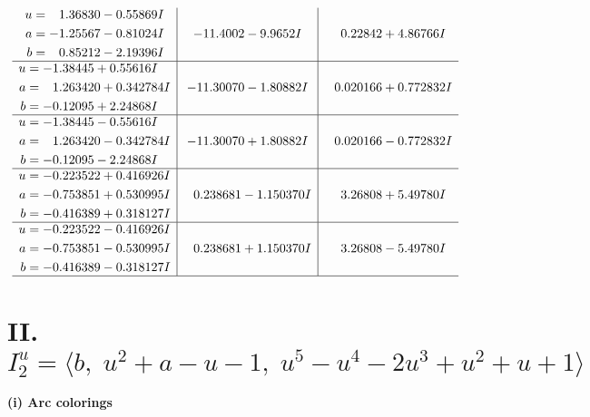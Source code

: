\documentclass[1p]{elsarticle_modified}
\theoremstyle{definition}
\begin{document}
$$\begin{array}{c|c|c}
\begin{aligned}
u &= \phantom{-}1.36830 - 0.55869 I \\
a &= -1.25567 - 0.81024 I \\
b &= \phantom{-}0.85212 - 2.19396 I\end{aligned}
 & -11.4002 - 9.9652 I & \phantom{-}0.22842 + 4.86766 I \\ \hline\begin{aligned}
u &= -1.38445 + 0.55616 I \\
a &= \phantom{-}1.263420 + 0.342784 I \\
b &= -0.12095 + 2.24868 I\end{aligned}
 & -11.30070 - 1.80882 I & \phantom{-}0.020166 + 0.772832 I \\ \hline\begin{aligned}
u &= -1.38445 - 0.55616 I \\
a &= \phantom{-}1.263420 - 0.342784 I \\
b &= -0.12095 - 2.24868 I\end{aligned}
 & -11.30070 + 1.80882 I & \phantom{-}0.020166 - 0.772832 I \\ \hline\begin{aligned}
u &= -0.223522 + 0.416926 I \\
a &= -0.753851 + 0.530995 I \\
b &= -0.416389 + 0.318127 I\end{aligned}
 & \phantom{-}0.238681 - 1.150370 I & \phantom{-}3.26808 + 5.49780 I \\ \hline\begin{aligned}
u &= -0.223522 - 0.416926 I \\
a &= -0.753851 - 0.530995 I \\
b &= -0.416389 - 0.318127 I\end{aligned}
 & \phantom{-}0.238681 + 1.150370 I & \phantom{-}3.26808 - 5.49780 I\\
 \hline 
 \end{array}$$\newpage\newpage\renewcommand{\arraystretch}{1}
\centering \section*{II. $I^u_{2}= \langle b,\;u^2+a- u-1,\;u^5- u^4-2 u^3+u^2+u+1 \rangle$}
\flushleft \textbf{(i) Arc colorings}\\
\end{document}
